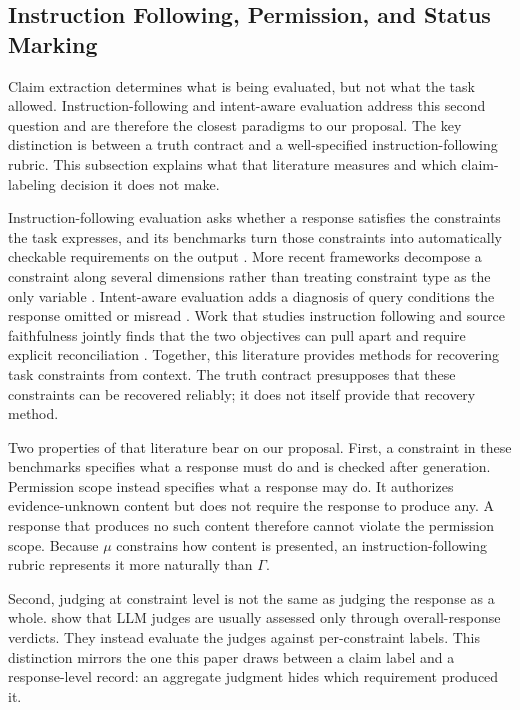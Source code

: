 \documentclass{clv2025}
\begin{document}
\subsection{Instruction Following, Permission, and Status Marking}

Claim extraction determines what is being evaluated, but not what the task
allowed. Instruction-following and intent-aware evaluation address this second
question and are therefore the closest paradigms to our proposal.
The key distinction is between a truth contract and a well-specified
instruction-following rubric.
This subsection explains what that literature measures and which claim-labeling
decision it does not make.

Instruction-following evaluation asks whether a response satisfies the
constraints the task expresses, and its benchmarks turn those constraints into
automatically checkable requirements on the output
\citep{zhou_ifeval_2023}.
More recent frameworks decompose a constraint along several dimensions rather
than treating constraint type as the only variable
\citep{ye_muldimif_2025}.
Intent-aware evaluation adds a diagnosis of query conditions the response
omitted or misread \citep{hao_faithqa_2025}.
Work that studies instruction following and source faithfulness jointly finds
that the two objectives can pull apart and require explicit reconciliation
\citep{wu_dancing_2024}.
Together, this literature provides methods for recovering task constraints from
context. The truth contract presupposes that these constraints can be recovered
reliably; it does not itself provide that recovery method.

Two properties of that literature bear on our proposal.
First, a constraint in these benchmarks specifies what a response must do and
is checked after generation. Permission scope instead specifies what a response
may do. It authorizes evidence-unknown content but does not require the response
to produce any. A response that produces no such content therefore cannot
violate the permission scope.
Because $\mu$ constrains how content is presented, an instruction-following
rubric represents it more naturally than $\Gamma$.

Second, judging at constraint level is not the same as judging the response as
a whole. \citet{lee_mcjudgebench_2026} show that LLM judges are usually assessed
only through overall-response verdicts. They instead evaluate the judges
against per-constraint labels.
This distinction mirrors the one this paper draws between a claim label and a
response-level record: an aggregate judgment hides which requirement produced
it.
\end{document}
